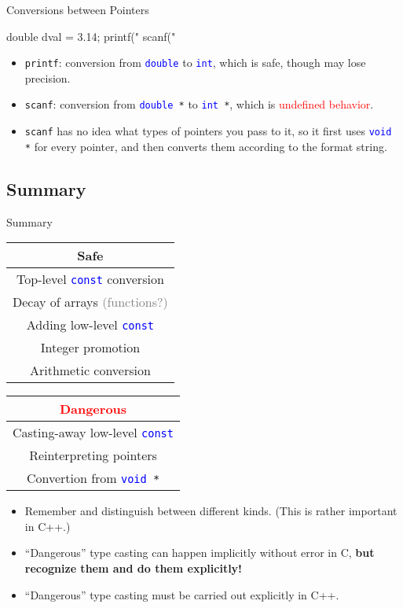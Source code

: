\documentclass{beamer}
\newcommand{\red}[1]{\textcolor{red}{#1}}
\newcommand{\blue}[1]{\textcolor{blue}{#1}}
\newcommand{\gray}[1]{\textcolor{gray}{#1}}
\newcommand{\ttt}[1]{\texttt{#1}}
\newcommand{\bluett}[1]{\blue{\ttt{#1}}}
\theoremstyle{definition}
\begin{document}
\begin{frame}[fragile]{Conversions between Pointers}
    \begin{cpp}
double dval = 3.14;
printf("%
scanf("%
    \end{cpp}
    \pause
    \begin{itemize}
        \item \ttt{printf}: conversion from \bluett{double} to \bluett{int}, which is safe, though may lose precision.
        \item \ttt{scanf}: conversion from \bluett{double }\ttt{*} to \bluett{int }\ttt{*}, which is \red{undefined behavior}.
        \pause
        \item \ttt{scanf} has no idea what types of pointers you pass to it, so it first uses \bluett{void }\ttt{*} for every pointer, and then converts them according to the format string.
    \end{itemize}
\end{frame}

\subsection{Summary}

\begin{frame}{Summary}
    \begin{center}
        \begin{tabular}{|c|}
            \hline
            Safe\\
            \hline
            Top-level \bluett{const} conversion\\
            Decay of arrays \gray{(functions?)}\\
            Adding low-level \bluett{const}\\
            Integer promotion\\
            Arithmetic conversion\\
            \hline
        \end{tabular}
        \begin{tabular}{|c|}
            \hline
            \red{Dangerous}\\
            \hline
            Casting-away low-level \bluett{const}\\
            Reinterpreting pointers\\
            Convertion from \bluett{void }\ttt{*}\\
            \hline
        \end{tabular}
    \end{center}
    \begin{itemize}
        \item Remember and distinguish between different kinds. (This is rather important in C++.)
        \item ``Dangerous'' type casting can happen implicitly without error in C, \textbf{but recognize them and do them explicitly!}
        \item ``Dangerous'' type casting must be carried out explicitly in C++.
    \end{itemize}
\end{frame}
\end{document}
